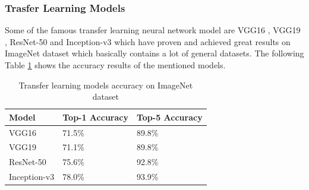 \subsubsection{Trasfer Learning Models}
Some of the famous transfer learning neural network model are VGG16 \cite{vgg_19}, VGG19 \cite{vgg_19}, ResNet-50 \cite{1512.03385} and Inception-v3 \cite{inception_v3} which have proven and achieved great results on ImageNet dataset which basically contains a lot of general datasets. The following Table \ref{pretrained_models_results} shows the accuracy results of the mentioned models.
\begin{table}[H]
\centering
\begin{tabular}{l | l | l}
Model & Top-1 Accuracy & Top-5 Accuracy\\
\hline
VGG16 & 71.5\% & 89.8\%  \\
VGG19 & 71.1\% & 89.8\%  \\
ResNet-50 & 75.6\% & 92.8\% \\
Inception-v3 & 78.0\% & 93.9\% 
\end{tabular}
\caption{Transfer learning models accuracy on ImageNet dataset \cite{tl_accuracy}}
\label{pretrained_models_results}
\end{table}
